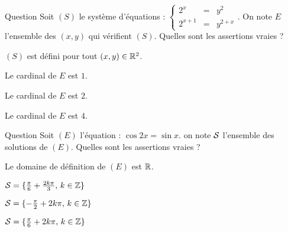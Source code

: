 \begin{multi}[multiple,feedback=
{\((S)\) est défini pour tout \(x\in \Rr\) et \(y>0\).
Soit \(x\in \Rr\) et \(y>0\), \((S) \Leftrightarrow \left\{\begin{array}{ccl}y&=&2^{\frac{x}{2}} \\2^{x+1}&=&2^{x+\frac{x^2}{2}} \end{array}\right.  \Leftrightarrow \left\{\begin{array}{ccl}y&=&2^{\frac{x}{2}} \\x^2&=&2 \end{array}\right. \). 
Donc \(E = \{ (\sqrt 2, \sqrt 2^{\sqrt 2})\,  ; (-\sqrt 2, \sqrt 2^{-\sqrt 2})\}\) et donc le cardinal de \(E\) est \(2\).
}]{Question}
Soit \((S)\) le système d'équations : \(\left\{\begin{array}{ccl}2^x&=&y^2\\2^{x+1}&=&y^{2+x} \end{array}\right.\).  On note \(E\) l'ensemble des \((x,y)\) qui vérifient \((S)\). Quelles sont les assertions vraies ?

    \item \((S)\) est défini  pour tout \( (x,y) \in \mathbb{R} ^2\).
    \item Le cardinal de \(E\) est \(1\).
    \item* Le cardinal de \(E\) est \(2\).
    \item Le cardinal de \(E\) est \(4\).
\end{multi}


\begin{multi}[multiple,feedback=
{\((E) \Leftrightarrow  \cos 2x =  \cos ( \frac{\pi}{2} -x) \Leftrightarrow      \exists k\in \Zz; \,  2x =  \frac{\pi}{2} -x +2k\pi \, \mbox {ou} \, 2x =  -\frac{\pi}{2} +x +2k\pi  \Leftrightarrow      \exists k\in \Zz;\,  x =  \frac{\pi}{6}  +\frac{ 2k\pi}{3} \, \mbox {ou} \, x =  -\frac{\pi}{2} +2k\pi\). 
Mais un \(x\) de la forme \(x =  -\frac{\pi}{2} +2k\pi\) peut s'écrire sous la forme
\(x = \frac{\pi}{6}  +\frac{ 2k'\pi}{3}\). 
Donc \({\cal{S}} = \{\frac{\pi}{6}  +\frac{ 2k\pi}{3}, \, k\in \Zz \}\).
}]{Question}
Soit \((E)\) l'équation : \( \cos 2x = \sin x \). on note \(\cal{S}\) l'ensemble des solutions de \((E)\). Quelles sont les assertions vraies ?

    \item* Le domaine de définition de \((E)\)  est  \(\mathbb{R}\).
    \item* \({\cal{S}} = \{\frac{\pi}{6}  +\frac{ 2k\pi}{3}, \, k\in \Zz \}  \)
    \item \({\cal{S}} =  \{ -\frac{\pi}{2} +2k\pi, \,  k\in \mathbb{Z} \} \)
    \item \({\cal{S}} =  \{ \frac{\pi}{6} +2k\pi, \,  k\in \mathbb{Z} \}\)
\end{multi}


